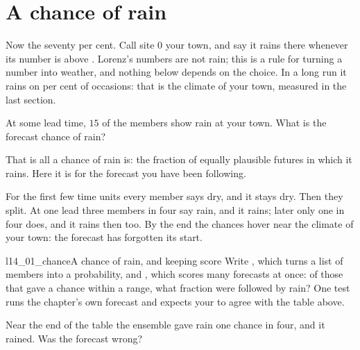 \section{A chance of rain}
\label{sec:ch14-rain}

\noindent
Now the seventy per cent. Call site 0 your town, and say it rains there
whenever its number is above . Lorenz's numbers are not rain;
this is a rule for turning a number into weather, and nothing below depends
on the choice. In a long run it rains on  per cent of
occasions: that is the climate of your town, measured in the last section.

\begin{think}
At some lead time, $15$ of the  members show rain at your
town. What is the forecast chance of rain?
\end{think}
That is all a chance of rain is: the fraction of equally plausible futures in
which it rains. Here it is for the forecast you have been following.



\noindent
For the first few time units every member says dry, and it stays dry. Then
they split. At one lead three members in four say rain, and it rains; later
only one in four does, and it rains then too. By the end the chances hover
near the climate of your town: the forecast has forgotten its start.

\begin{lab}{l14_01_chance}{A chance of rain, and keeping score}
Write , which turns a list of members into a probability, and
, which scores many forecasts at once: of those that gave a
chance within a range, what fraction were followed by rain? One test runs
the chapter's own forecast and expects your  to agree with the
table above.
\end{lab}

\begin{think}
Near the end of the table the ensemble gave rain one chance in four, and it
rained. Was the forecast wrong?
\end{think}

